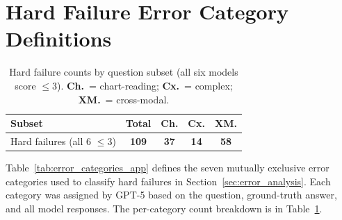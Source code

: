 \documentclass{article} %
\begin{document}
\FloatBarrier
\section{Hard Failure Error Category Definitions}
\label{app:error_categories}


\begin{table}[htbp]
\centering
\footnotesize
\setlength{\tabcolsep}{6pt}
\begin{tabular}{@{}lcccc@{}}
\toprule
\textbf{Subset} & \textbf{Total} & \textbf{Ch.} & \textbf{Cx.} & \textbf{XM.} \\
\midrule
Hard failures (all 6 $\leq 3$) & \textbf{109} & \textbf{37} & \textbf{14} & \textbf{58} \\
\bottomrule
\end{tabular}
\caption{Hard failure counts by question subset (all six models score $\leq 3$).
  \textbf{Ch.}~= chart-reading; \textbf{Cx.}~= complex; \textbf{XM.}~= cross-modal.}
\label{tab:hard_failure_counts}
\end{table}

Table~\ref{tab:error_categories_app} defines the seven mutually exclusive error
categories used to classify hard failures in Section~\ref{sec:error_analysis}.
Each category was assigned by GPT-5 based on the question, ground-truth answer,
and all model responses.
The per-category count breakdown is in Table~\ref{tab:hard_failure_counts}.
\end{document}
